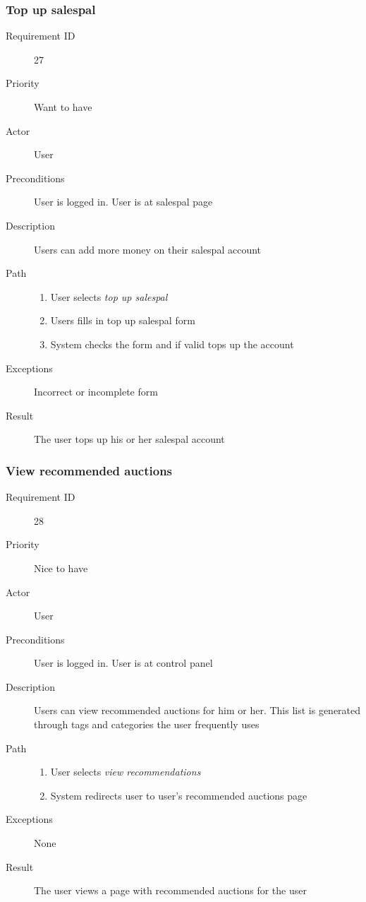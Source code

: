 		\subsubsection{Top up salespal}
			\begin{description}
				\item[Requirement ID] 27
				\item[Priority] Want to have
				\item[Actor] User
				\item[Preconditions] User is logged in. User is at salespal page
				\item[Description] Users can add more money on their salespal account
				\item[Path]
 					\begin{enumerate}
						\item User selects \emph{top up salespal}
						\item Users fills in top up salespal form
						\item System checks the form and if valid tops up the account
					\end{enumerate}
				\item[Exceptions] Incorrect or incomplete form
				\item[Result] The user tops up his or her salespal account
			\end{description}
		\subsubsection{View recommended auctions}
			\begin{description}
				\item[Requirement ID] 28
				\item[Priority] Nice to have
				\item[Actor] User
				\item[Preconditions] User is logged in. User is at control panel
				\item[Description] Users can view recommended auctions for him or her. This list 
					is generated through tags and categories the user frequently uses
				\item[Path]
 					\begin{enumerate}
						\item User selects \emph{view recommendations}
						\item System redirects user to user's recommended auctions page
					\end{enumerate}
				\item[Exceptions] None
				\item[Result] The user views a page with recommended auctions for the user
			\end{description}
